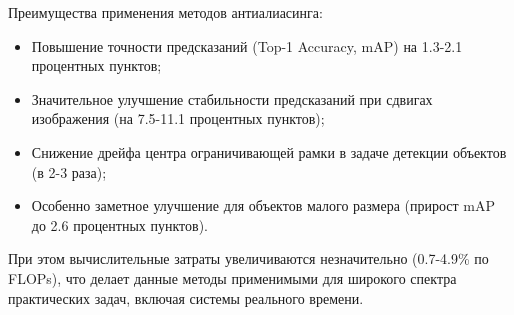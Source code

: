 Преимущества применения методов антиалиасинга:
\begin{itemize}
    \item Повышение точности предсказаний (Top-1 Accuracy, mAP) на 1.3-2.1 процентных пунктов;
    \item Значительное улучшение стабильности предсказаний при сдвигах изображения (на 7.5-11.1 процентных пунктов);
    \item Снижение дрейфа центра ограничивающей рамки в задаче детекции объектов (в 2-3 раза);
    \item Особенно заметное улучшение для объектов малого размера (прирост mAP до 2.6 процентных пунктов).
\end{itemize}

При этом вычислительные затраты увеличиваются незначительно (0.7-4.9\% по FLOPs), что делает данные методы применимыми для широкого спектра практических задач, включая системы реального времени.

\newpage
